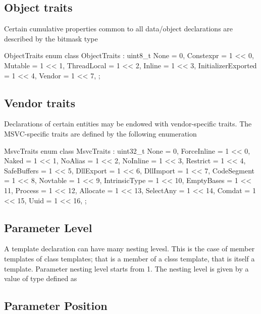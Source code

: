 \subsection{Object traits}
\label{sec:ifc-object-traits}

Certain cumulative properties common to all data/object declarations are described by the bitmask type 
%
\begin{typedef}{ObjectTraits}{}
	enum class ObjectTraits : uint8_t {
		None					= 0,
		Constexpr				= 1 << 0,
		Mutable				= 1 << 1,
		ThreadLocal			= 1 << 2,
		Inline					= 1 << 3,
		InitializerExported	= 1 << 4,
		Vendor					= 1 << 7,
	};
\end{typedef}
%


\subsection{Vendor traits}
\label{sec:ifc-msvc-trait-bitset}

Declarations of certain entities may be endowed with vendor-specific traits.
The MSVC-specific traits are defined by the following enumeration
\begin{typedef}{MsvcTraits}{}
	enum class MsvcTraits : uint32_t {
		None					= 0,
		ForceInline			= 1 << 0,
		Naked					= 1 << 1,
		NoAlias				= 1 << 2,
		NoInline				= 1 << 3,
		Restrict				= 1 << 4,
		SafeBuffers			= 1 << 5,
		DllExport				= 1 << 6,
		DllImport				= 1 << 7,
		CodeSegment			= 1 << 8,
		Novtable				= 1 << 9,
		IntrinsicType			= 1 << 10,
		EmptyBases			= 1 << 11,
		Process				= 1 << 12,
		Allocate				= 1 << 13,
		SelectAny				= 1 << 14,
		Comdat				= 1 << 15,
		Uuid					= 1 << 16,
	};
\end{typedef}

\subsection{Parameter Level}

A template declaration can have many nesting levesl.  This is the case of member templates of class templates; that is a member of a clsss template, that is itself a template.
Parameter nesting level starts from 1.  The nesting level is given by a value of type  defined as

\subsection{Parameter Position}

